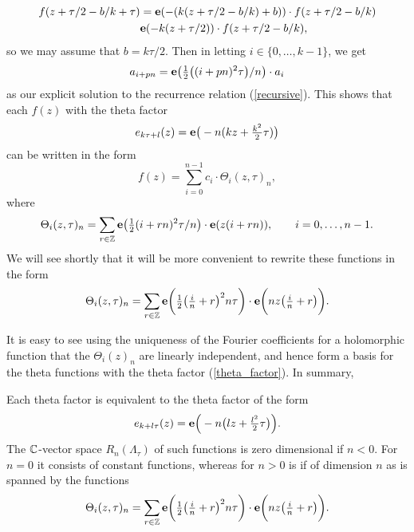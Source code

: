 \begin{equation*}
\begin{split}
f(z + \tau/2 - b/k + \tau) &= \mathbf{e}(-(k(z + \tau/2 - b/k) + b))\cdot f(z + \tau/2 - b/k)\\
&\mathbf{e}(-k(z + \tau/2))\cdot f(z + \tau/2 - b/k),
\end{split}
\end{equation*}
so we may assume that $b = k\tau/2$. Then in letting $i \in \{0,\ldots, k-1\}$, we get \cite{Dolgachev_1997}
\begin{equation*}
	a_{i + pn} = \mathbf{e} \big( \tfrac{1}{2}\big( (i + pn)^{2}\tau  \big)/n\big)\cdot a_{i}
\end{equation*}
as our explicit solution to the recurrence relation (\ref{recursive}). This shows that each $f(z)$ with the theta factor
\begin{equation}
\label{theta_factor}
	e_{k\tau + l}(z) = \mathbf{e}\big(-n(kz + \tfrac{k^{2}}{2}\tau )\big)
\end{equation}
can be written in the form
\begin{equation*}
	f(z) = \sum_{i=0}^{n-1} c_{i}\cdot \Theta_{i}(z,\tau)_{n},
\end{equation*}
where
\begin{equation*}
	\Theta_{i}(z,\tau)_{n}= \sum_{r\in\mathbb{Z}} \mathbf{e}\big(\tfrac{1}{2}(i + rn)^{2}\tau/n\big)\cdot \mathbf{e}(z(i + rn)),\qquad i = 0,\ldots, n-1.
\end{equation*}
We will see shortly that it will be more convenient to rewrite these functions in the form
\begin{equation}
	\label{big_theta}
	\Theta_{i}(z,\tau)_{n}= \sum_{r\in\mathbb{Z}} \mathbf{e}\bigg(\tfrac{1}{2}\big(\tfrac{i}{n} + r\big)^{2}n\tau\bigg)\cdot \mathbf{e} \bigg(nz\big(\tfrac{i}{n} + r\big)\bigg).
\end{equation}

It is easy to see using the uniqueness of the Fourier coefficients for a holomorphic function that the $\Theta_{i}(z)_{n}$ are linearly independent, and hence form a basis for the theta functions with the theta factor (\ref{theta_factor}). In summary,\\

\begin{prop}
	\label{theta_basis_one}
	Each theta factor is equivalent to the theta factor of the form
	\begin{equation*}
		e_{k+l\tau}(z) = \mathbf{e}\Big(-n\big(lz + \tfrac{l^{2}}{2}\tau\big)\Big).
	\end{equation*}
	The $\mathbb{C}$-vector space $R_{n}(\Lambda_{\tau})$ of such functions is zero dimensional if $n<0$. For $n = 0$ it consists of constant functions, whereas for $n >0$ is if of dimension $n$ as is spanned by the functions
	\begin{equation*}
	\Theta_{i}(z,\tau)_{n}= \sum_{r\in\mathbb{Z}} \mathbf{e}\bigg(\tfrac{1}{2}\big(\tfrac{i}{n} + r\big)^{2}n\tau\bigg)\cdot \mathbf{e} \bigg(nz\big(\tfrac{i}{n} + r\big)\bigg).
	\end{equation*}
\end{prop}


